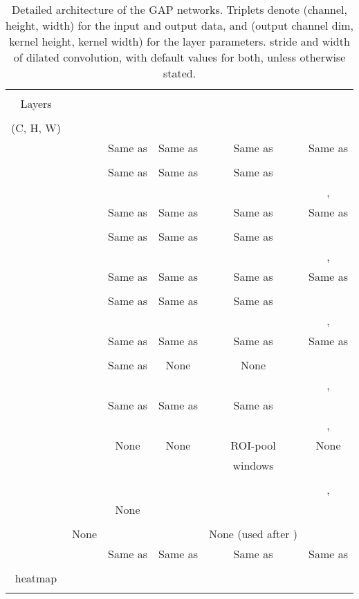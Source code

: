 \documentclass[british,10pt,twocolumn,letterpaper]{article}
\providecommand{\tabularnewline}{\\}
\begin{document}
\begin{table*}
\caption{\label{tab:GAP-networks}Detailed architecture of the GAP networks.
Triplets denote (channel, height, width) for the input and output
data, and (output channel dim, kernel height, kernel width) for the
layer parameters. stride and width
of dilated convolution, with default values  for both, unless
otherwise stated.}

\begin{centering}
\begin{tabular}{cccccc}
 &  &  &  &  & \tabularnewline
Layers &  &  &   &   &  \tabularnewline
 & \cite{Simonyan2015Iclr} &  \cite{zhou2015cnnlocalization} & \cite{kolesnikov2016seed} &  & \cite{Chen2016ArxivDeeplabv2}\tabularnewline
\hline 
 (C, H, W) &  &  &  &  & \tabularnewline
\hline 
 &  & Same as & Same as & Same as & Same as\tabularnewline
 &  &  &  &  & \tabularnewline
\hline 
 &  & Same as & Same as & Same as & \tabularnewline
 &  &  &  &  & , \tabularnewline
\hline 
 &  & Same as & Same as & Same as & Same as\tabularnewline
 &  &  &  &  & \tabularnewline
\hline 
 &  & Same as & Same as & Same as & \tabularnewline
 &  &  &  &  & , \tabularnewline
\hline 
 &  & Same as & Same as & Same as & Same as\tabularnewline
 &  &  &  &  & \tabularnewline
\hline 
 &  & Same as & Same as & Same as & \tabularnewline
 &  &  &  &  & , \tabularnewline
\hline 
 &  & Same as & Same as & Same as & Same as\tabularnewline
 &  &  &  &  & \tabularnewline
\hline 
 &  & Same as & None & None & \tabularnewline
 &  &  &  &  & , \tabularnewline
\hline 
 &  & Same as & Same as & Same as & \tabularnewline
 &  &  &  &  & , \tabularnewline
\hline 
 &  & None & None & ROI-pool & None\tabularnewline
 &  &  &  &  windows & \tabularnewline
\hline 
 &  &  &  &  & \tabularnewline
 &  &  &  &  & , \tabularnewline
\hline 
 &  & None &  &  & \tabularnewline
 &  &  &  &  & \tabularnewline
\hline 
 & None &  &  & None (used after ) & \tabularnewline
\hline 
 &  & Same as & Same as & Same as & Same as\tabularnewline
 &  &  &  &  & \tabularnewline
\hline 
 heatmap &  &  &  &  & \tabularnewline
\hline 
 &  &  &  &  & \tabularnewline
\end{tabular}
\par\end{centering}
\end{table*}

\newpage
\end{document}
